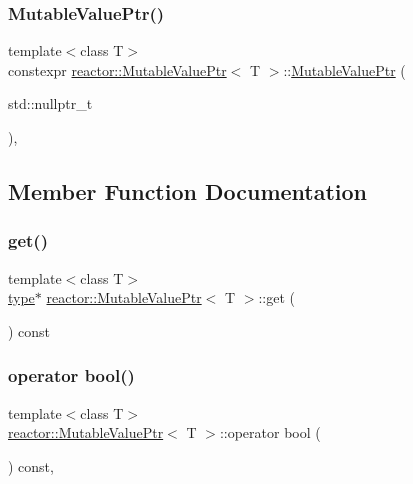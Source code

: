 \subsubsection{\texorpdfstring{Mutable\+Value\+Ptr()}{MutableValuePtr()}\hspace{0.1cm}{\footnotesize\ttfamily [5/5]}}
{\footnotesize\ttfamily template$<$class T$>$ \\
constexpr \hyperlink{classreactor_1_1MutableValuePtr}{reactor\+::\+Mutable\+Value\+Ptr}$<$ T $>$\+::\hyperlink{classreactor_1_1MutableValuePtr}{Mutable\+Value\+Ptr} (\begin{DoxyParamCaption}\item[{std\+::nullptr\+\_\+t}]{ }\end{DoxyParamCaption})\hspace{0.3cm}{\ttfamily [inline]}, {\ttfamily [explicit]}}



\subsection{Member Function Documentation}
\mbox{\label{classreactor_1_1MutableValuePtr_ad379c13d736742a08f8b1f31cb9d4426}} 
\subsubsection{\texorpdfstring{get()}{get()}}
{\footnotesize\ttfamily template$<$class T$>$ \\
\hyperlink{classreactor_1_1MutableValuePtr_a6dfaa60279549db876d8ea8b1135b46a}{type}$\ast$ \hyperlink{classreactor_1_1MutableValuePtr}{reactor\+::\+Mutable\+Value\+Ptr}$<$ T $>$\+::get (\begin{DoxyParamCaption}{ }\end{DoxyParamCaption}) const\hspace{0.3cm}{\ttfamily [inline]}}

\mbox{\label{classreactor_1_1MutableValuePtr_a334c0a48458c92a312a02bb7993f221a}} 
\subsubsection{\texorpdfstring{operator bool()}{operator bool()}}
{\footnotesize\ttfamily template$<$class T$>$ \\
\hyperlink{classreactor_1_1MutableValuePtr}{reactor\+::\+Mutable\+Value\+Ptr}$<$ T $>$\+::operator bool (\begin{DoxyParamCaption}{ }\end{DoxyParamCaption}) const\hspace{0.3cm}{\ttfamily [inline]}, {\ttfamily [explicit]}}

